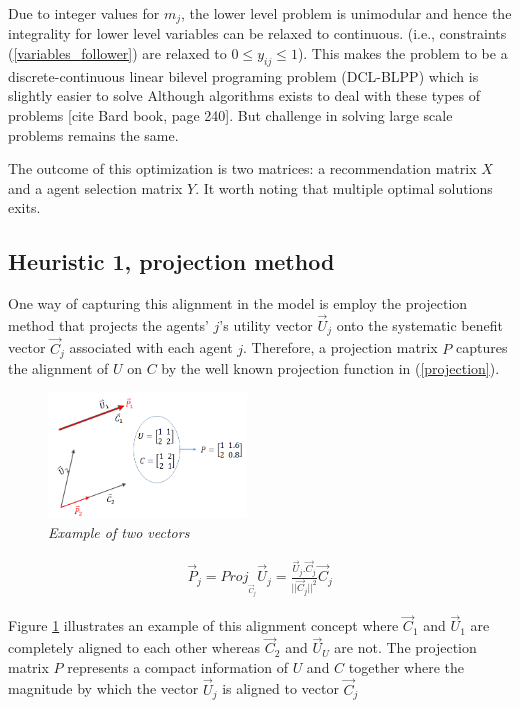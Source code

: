 \documentclass[11pt, letterpaper]{article}
\begin{document}
Due to integer values for $m_j$, the lower level problem is unimodular and hence the integrality for lower level variables can be relaxed to continuous. (i.e., constraints (\ref{variables_follower}) are relaxed to $0\leq y_{ij} \leq 1$). This makes the problem to be a discrete-continuous linear  bilevel programing problem (DCL-BLPP) which is slightly easier to solve Although algorithms exists to deal with these types of problems [cite Bard book, page 240]. But challenge in solving large scale problems remains the same.

The outcome of this optimization is two matrices: a recommendation matrix $X$ and a agent selection matrix $Y$. It worth noting that multiple optimal solutions exits.

\subsection{Heuristic 1, projection method}
 One way of capturing this alignment in the model is employ the projection method that projects the agents' $j$'s utility vector $\vec{U}_{j}$ onto the systematic benefit vector $\vec{C}_{j}$ associated with each agent $j$. Therefore, a projection matrix $P$ captures the alignment of $U$ on $C$ by the well known projection function in (\ref{projection}). 

\begin{figure}
\centering
\includegraphics[width=0.47\textwidth]{projection_example.png}
\caption{\emph{Example of two vectors}}   \label{fig:projection}
\end{figure}  
\noindent
\vspace{-.1in}
\begin{align}
\vec{P}_{j}=Proj_{_{\vec{C}_{j}}}\vec{U}_{j}=\frac{\vec{U}_{j}.\vec{C}_{j}}{||\vec{C}_{j}||^2} \vec{C}_{j} \label{projection} 
\end{align}

Figure \ref{fig:projection} illustrates an example of this alignment concept where $\vec{C}_{1}$ and $\vec{U}_{1}$ are completely aligned to each other whereas $\vec{C}_{2}$  and $\vec{U}_{U}$  are not. The projection matrix $P$ represents a compact information of $U$ and $C$ together where the magnitude by which the vector $\vec{U}_{j}$ is aligned to vector $\vec{C}_{j}$
\end{document}
